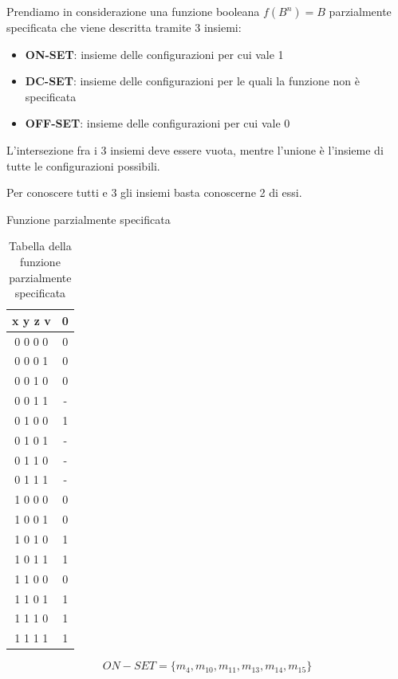 \documentclass[a4paper]{article}
\theoremstyle{break}
\theoremstyle{break}
\theoremstyle{break}
\theoremstyle{break}
\begin{document}
Prendiamo in considerazione una funzione booleana \( f(B^n)=B \) parzialmente
specificata che viene descritta tramite 3 insiemi:
\begin{itemize}
    \item \textbf{ON-SET}: insieme delle configurazioni per cui vale 1
    \item \textbf{DC-SET}: insieme delle configurazioni per le quali
        la funzione non è specificata
    \item \textbf{OFF-SET}: insieme delle configurazioni per cui vale 0
\end{itemize}
L'intersezione fra i 3 insiemi deve essere vuota, mentre l'unione è l'insieme
di tutte le configurazioni possibili.

Per conoscere tutti e 3 gli insiemi basta conoscerne 2 di essi.
\begin{example}
    Funzione parzialmente specificata
    \begin{table}[H]
        \begin{center}
            \begin{tabular}{c|c}
                x y z v & 0\\
                \hline
                0 0 0 0 & 0\\
                0 0 0 1 & 0\\
                0 0 1 0 & 0\\
                0 0 1 1 & -\\
                0 1 0 0 & 1\\
                0 1 0 1 & -\\
                0 1 1 0 & -\\
                0 1 1 1 & -\\
                1 0 0 0 & 0\\
                1 0 0 1 & 0\\
                1 0 1 0 & 1\\
                1 0 1 1 & 1\\
                1 1 0 0 & 0\\
                1 1 0 1 & 1\\
                1 1 1 0 & 1\\
                1 1 1 1 & 1\\
            \end{tabular}
        \end{center}
        \caption{Tabella della funzione parzialmente specificata}
    \end{table}
        \[ON-SET = \{ m_4,m_{10},m_{11},m_{13},m_{14},m_{15} \} \]

\end{example}
\end{document}
